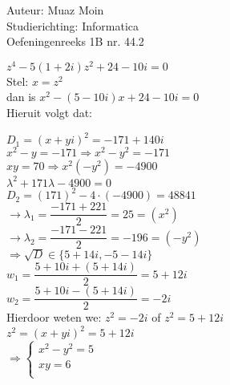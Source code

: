 \documentclass[a4paper]{article}
\begin{document}
  
\noindent \large Auteur: Muaz Moin\\
\noindent \large Studierichting: Informatica\\
\noindent \large Oefeningenreeks 1B nr. 44.2\\

\medskip

\normalsize

$z^4-5(1+2i)z^2+24-10i=0$\\

Stel: $x=z^2$\\

dan is $x^2-(5-10i)x+24-10i=0$\\

Hieruit volgt dat:

$D_1 = \left(x + yi\right)^2 = -171 + 140i$\\

$x^2 - y = -171 \Rightarrow x^2 - y^2 = -171$\\

$xy = 70 \Rightarrow x^2 \left( - y^2\right) = -4900$\\

$\lambda^2 + 171\lambda - 4900 = 0$\\

$D_2 = \left(171\right)^2 - 4 \cdot \left(-4900\right) = 48841$\\

$\rightarrow\lambda_1 = \dfrac{-171 + 221}{2} = 25 = \left(x^2\right)$\\

$\rightarrow\lambda_2 = \dfrac{-171 - 221}{2} = -196= \left(-y^2\right) $\\

$\Rightarrow \sqrt{D} \in \{ 5+14i, -5 - 14i\}$\\

$w_1 = \dfrac{5 + 10i + \left(5 + 14i \right)}{2} = 5 + 12i$\\

$w_2 = \dfrac{5 + 10i - \left(5 + 14i \right)}{2} = -2i $\\

Hierdoor weten we: $z^2 = -2i$ of $z^2 = 5 + 12i$\\

$z^2 = \left( x + yi\right)^2 = 5+12i$\\

    $\Rightarrow\left\{
	\begin{array}{l}
		x^2 - y^2 = 5\\
		xy = 6\\
	\end{array}
    \right .$\\
\end{document}

